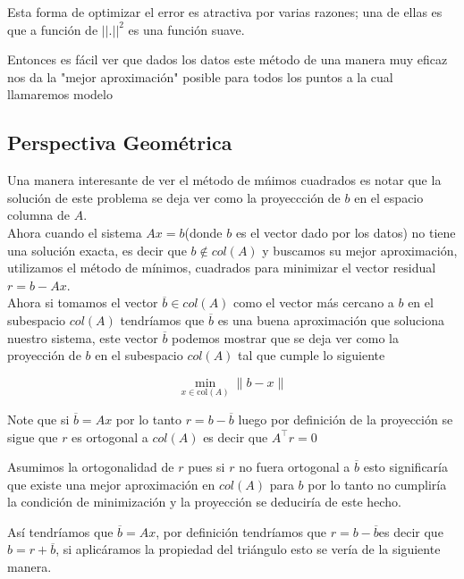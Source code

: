 \documentclass[12pt]{article}
\begin{document}
Esta forma de optimizar el error es atractiva por varias razones; una de ellas es que a funci\'on de $||.||^2$ es una funci\'on suave.

Entonces es f\'acil ver que dados los datos este m\'etodo de una manera muy eficaz nos da la "mejor aproximaci\'on" posible para todos los puntos a la cual llamaremos modelo
\vspace{0.7cm}



\begin{center}
    \section{Perspectiva Geom\'etrica}
\end{center}
\vspace{0.7cm}
Una manera interesante de ver el m\'etodo de m\'nimos cuadrados es notar que la soluci\'on de este problema se deja ver como la proyeccci\'on  de $b$ en el espacio columna de $A$.\\

Ahora cuando el sistema $Ax=b$(donde $b$ es el vector dado por los datos) no tiene una soluci\'on exacta, es decir que $b\notin col(A)$ y buscamos su mejor aproximaci\'on, utilizamos el m\'etodo de m\'inimos, cuadrados para minimizar el vector residual $r=b-Ax$.\\

Ahora si tomamos el vector $\overline{b}\in col(A)$ como el vector m\'as cercano a $b$ en el subespacio $col(A)$ tendr\'iamos que $\overline{b}$ es una buena aproximaci\'on que soluciona nuestro sistema, este vector $\overline{b}$ podemos mostrar que se deja ver como la proyecci\'on  de $b$ en el subespacio $col(A)$  tal que cumple lo siguiente 

\[
\min_{x \in \text{col}(A)} \| b - x \|
\]

Note que si $\overline{b}=Ax$ por lo tanto $r=b-\overline{b}$ luego por definición de la proyecci\'on  se sigue que $r$ es ortogonal a $col(A)$ es decir que $A^\top r=0$ 

Asumimos la ortogonalidad de $r$ pues si $r$ no fuera ortogonal a $\overline{b}$ esto significar\'ia que existe una mejor aproximaci\'on en $col(A)$ para $b$ por lo tanto no cumplir\'ia la condici\'on de minimizaci\'on y la proyecci\'on se deducir\'ia  de este hecho.

As\'i tendr\'iamos que $\overline{b}=Ax$, por definici\'on tendr\'iamos que $r=b-\overline{b}$es decir que $b=r+\overline{b}$, si aplicáramos la propiedad del triángulo esto se ver\'ia de la siguiente manera.
\end{document}
